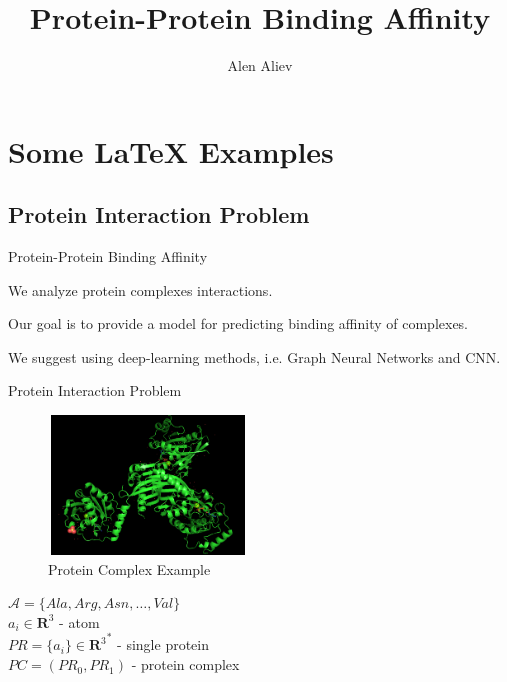 \documentclass{beamer}
\title[Your Short Title]{Protein-Protein Binding Affinity}
\author{Alen Aliev}
\institute{MIPT}
\date{}
\begin{document}
\begin{frame}
  \titlepage
\end{frame}


\section{Some \LaTeX{} Examples}

\subsection{Protein Interaction Problem}

\begin{frame}{Protein-Protein Binding Affinity}

We analyze protein complexes interactions. \\ 
\bigskip

Our goal is to provide a model for predicting binding affinity of complexes. \\
\bigskip

We suggest using deep-learning methods, i.e. Graph Neural Networks and CNN.

\end{frame}


\begin{frame}{Protein Interaction Problem}

\begin{figure}
\includegraphics[width=200px, height=140px]{ProteinExample.png}
\caption{\label{fig:your-figure}Protein Complex Example}
\end{figure}

$\mathcal{A} = \{Ala, Arg, Asn, \ldots, Val \}$ \\
$a_i \in \mathbf{R}^3$ - atom \\
$PR = \{a_i\} \in  {\mathbf{R}^3}^*$ - single protein \\
$PC = (PR_0, PR_1)$ - protein complex \\

\end{frame}
\end{document}
